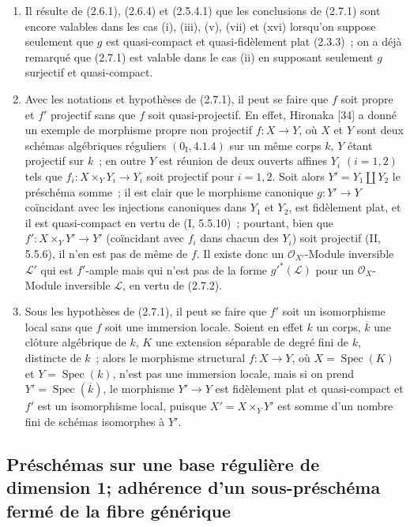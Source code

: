 \begin{remark}[2.7.3]
\label{IV.2.7.3-fr}
\begin{enumerate}
\item[(i)] Il résulte de (2.6.1), (2.6.4) et (2.5.4.1) que les conclusions
de (2.7.1) sont encore valables dans les cas (i), (iii), (v), (vii) et
(xvi) lorsqu'on suppose seulement que $g$ est quasi-compact et
quasi-fidèlement plat (2.3.3)~; on a déjà remarqué que (2.7.1) est valable
dans le cas (ii) en supposant seulement $g$ surjectif et quasi-compact.

\item[(ii)] Avec les notations et hypothèses de (2.7.1), il peut se faire
que $f$ soit propre et $f'$ projectif sans que $f$ soit quasi-projectif. En
effet, Hironaka [34] a donné un exemple de morphisme propre non projectif
$f:X\to Y$, où $X$ et $Y$ sont deux schémas algébriques réguliers
$(0_{\mathrm I},4.1.4)$ sur un même corps $k$, $Y$ étant projectif sur $k$~;
en outre $Y$ est réunion de deux ouverts affines $Y_i$ $(i=1,2)$ tels que
$f_i:X\times_Y Y_i\to Y_i$ soit projectif pour $i=1,2$. Soit alors
$Y'=Y_1\amalg Y_2$ le préschéma somme~; il est clair que le morphisme
canonique $g:Y'\to Y$ coïncidant avec les injections canoniques dans $Y_1$
et $Y_2$, est fidèlement plat, et il est quasi-compact en vertu de
(I, 5.5.10)~; pourtant, bien que $f':X\times_Y Y'\to Y'$ (coïncidant avec
$f_i$ dans chacun des $Y_i$) soit projectif (II, 5.5.6), il n'en est pas de
même de $f$. Il existe donc un $\mathcal O_{X'}$-Module inversible
$\mathcal L'$ qui est $f'$-ample mais qui n'est pas de la forme
$g'^*(\mathcal L)$ pour un $\mathcal O_X$-Module inversible $\mathcal L$, en
vertu de (2.7.2).

\item[(iii)] Sous les hypothèses de (2.7.1), il peut se faire que $f'$ soit
un isomorphisme local sans que $f$ soit une immersion locale. Soient en
effet $k$ un corps, $\overline k$ une clôture algébrique de $k$, $K$ une
extension séparable de degré fini de $k$, distincte de $k$~; alors le
morphisme structural $f:X\to Y$, où $X=\operatorname{Spec}(K)$ et
$Y=\operatorname{Spec}(k)$, n'est pas une immersion locale, mais si on prend
$Y'=\operatorname{Spec}(\overline k)$, le morphisme $Y'\to Y$ est
fidèlement plat et quasi-compact et $f'$ est un isomorphisme local, puisque
$X'=X\times_Y Y'$ est somme d'un nombre fini de schémas isomorphes à $Y'$.
\end{enumerate}
\end{remark}

\subsection{Préschémas sur une base régulière de dimension 1; adhérence d'un
sous-préschéma fermé de la fibre générique}
\label{subsection:IV.2.8-fr}


